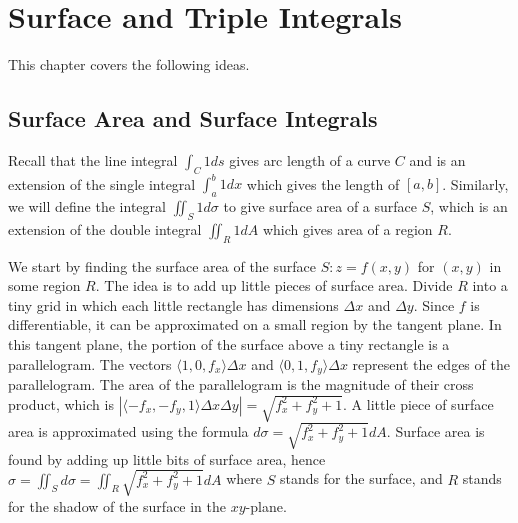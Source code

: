 
\chapter{Surface and Triple Integrals}

This chapter covers the following ideas. 


\section{Surface Area and Surface Integrals}
%
Recall that the line integral $\int_C 1 ds$ gives arc length of a curve
$C$ and is an extension of the single integral $\int_a^b 1 dx$ which
gives the length of $[a,b]$.  Similarly, we will define the integral
$\iint_S 1 d\sigma$ to give surface area of a surface $S$, which is an
extension of the double integral $\iint_R 1 dA$ which gives area of a
region $R$.

We start by finding the surface area of the surface {$S: z=f(x,y) $}
for $(x,y)$ in some region $R$. The idea is to add up little pieces of
surface area. Divide $R$ into a tiny grid in which each little
rectangle has dimensions $\Delta x$ and $\Delta y$. Since $f$ is differentiable,
it can be approximated on a small region by the tangent plane.  In
this tangent plane, the portion of the surface above a tiny rectangle
is a parallelogram.  The vectors $\langle1,0,f_x\rangle\Delta x$ and
$\langle0,1,f_y\rangle\Delta x$ represent the edges of the
parallelogram. The area of the parallelogram is the magnitude of their
cross product, which is $|\langle-f_x,-f_y,1\rangle\Delta x\Delta y| =
\sqrt{f_x^2+f_y^2+1}$. A little piece of surface area is approximated
using the formula $d\sigma = \sqrt{f_x^2+f_y^2+1}dA$. Surface area is found
by adding up little bits of surface area, hence {$ \sigma=\iint_S d\sigma =
  \iint_R \sqrt{f_x^2+f_y^2+1} dA $} where {$S$} stands for the
surface, and {$R$} stands for the shadow of the surface in the
{$xy$}-plane.

